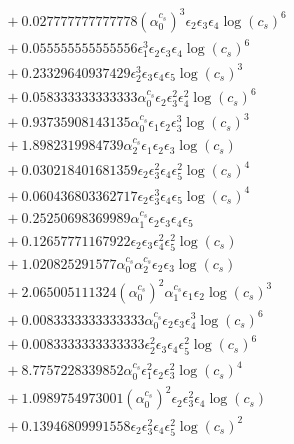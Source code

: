 \documentclass[10pt]{article}
\begin{document}
\begin{align*}
&{}  + 0.027777777777778 \left(\alpha_{0}^{c_s}\right)^{3} \epsilon_{2} \epsilon_{3} \epsilon_{4} \log{\left(c_{s} \right)}^{6} \\
&{}  + 0.055555555555556 \epsilon_{1}^{3} \epsilon_{2} \epsilon_{3} \epsilon_{4} \log{\left(c_{s} \right)}^{6} \\
&{}  + 0.23329640937429 \epsilon_{2}^{3} \epsilon_{3} \epsilon_{4} \epsilon_{5} \log{\left(c_{s} \right)}^{3} \\
&{}  + 0.058333333333333 \alpha_{0}^{c_s} \epsilon_{2} \epsilon_{3}^{2} \epsilon_{4}^{2} \log{\left(c_{s} \right)}^{6} \\
&{}  + 0.93735908143135 \alpha_{0}^{c_s} \epsilon_{1} \epsilon_{2} \epsilon_{3}^{3} \log{\left(c_{s} \right)}^{3} \\
&{}  + 1.8982319984739 \alpha_{2}^{c_s} \epsilon_{1} \epsilon_{2} \epsilon_{3} \log{\left(c_{s} \right)} \\
&{}  + 0.030218401681359 \epsilon_{2} \epsilon_{3}^{2} \epsilon_{4} \epsilon_{5}^{2} \log{\left(c_{s} \right)}^{4} \\
&{}  + 0.060436803362717 \epsilon_{2} \epsilon_{3}^{3} \epsilon_{4} \epsilon_{5} \log{\left(c_{s} \right)}^{4} \\
&{}  + 0.25250698369989 \alpha_{1}^{c_s} \epsilon_{2} \epsilon_{3} \epsilon_{4} \epsilon_{5} \\
&{}  + 0.12657771167922 \epsilon_{2} \epsilon_{3} \epsilon_{4}^{2} \epsilon_{5}^{2} \log{\left(c_{s} \right)} \\
&{}  + 1.020825291577 \alpha_{0}^{c_s} \alpha_{2}^{c_s} \epsilon_{2} \epsilon_{3} \log{\left(c_{s} \right)} \\
&{}  + 2.065005111324 \left(\alpha_{0}^{c_s}\right)^{2} \alpha_{1}^{c_s} \epsilon_{1} \epsilon_{2} \log{\left(c_{s} \right)}^{3} \\
&{}  + 0.0083333333333333 \alpha_{0}^{c_s} \epsilon_{2} \epsilon_{3} \epsilon_{4}^{3} \log{\left(c_{s} \right)}^{6} \\
&{}  + 0.0083333333333333 \epsilon_{2}^{2} \epsilon_{3} \epsilon_{4} \epsilon_{5}^{2} \log{\left(c_{s} \right)}^{6} \\
&{}  + 8.7757228339852 \alpha_{0}^{c_s} \epsilon_{1}^{2} \epsilon_{2} \epsilon_{3}^{2} \log{\left(c_{s} \right)}^{4} \\
&{}  + 1.0989754973001 \left(\alpha_{0}^{c_s}\right)^{2} \epsilon_{2} \epsilon_{3}^{2} \epsilon_{4} \log{\left(c_{s} \right)} \\
&{}  + 0.13946809991558 \epsilon_{2} \epsilon_{3}^{2} \epsilon_{4} \epsilon_{5}^{2} \log{\left(c_{s} \right)}^{2} \\

\end{align*}
\end{document}
